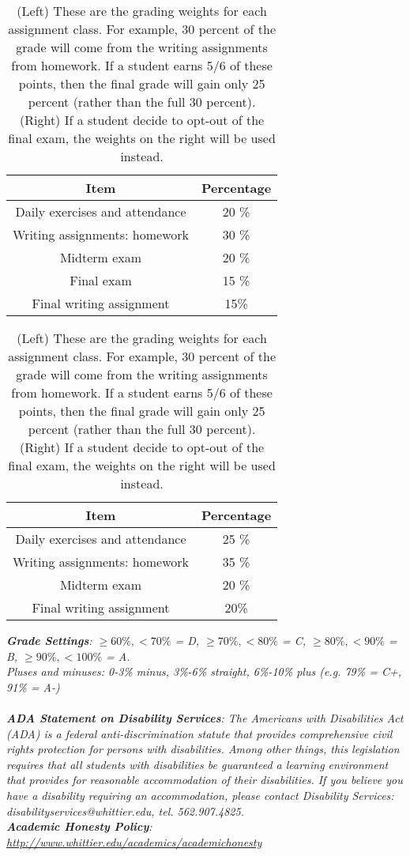 \documentclass[10pt]{article}
\begin{document}
\begin{table}[h]
\centering
\begin{tabular}{| c | c |}
\hline
Item & Percentage \\ \hline \hline
Daily exercises and attendance & 20 \% \\ \hline
Writing assignments: homework & 30 \% \\ \hline
Midterm exam & 20 \% \\ \hline
Final exam & 15 \% \\ \hline
Final writing assignment & 15\% \\ \hline
\end{tabular}
\begin{tabular}{| c | c |}
\hline
Item & Percentage \\ \hline \hline
Daily exercises and attendance & 25 \% \\ \hline
Writing assignments: homework & 35 \% \\ \hline
Midterm exam & 20 \% \\ \hline
Final writing assignment & 20\% \\ \hline
\end{tabular}
\caption{\label{tab:grades} (Left) These are the grading weights for each assignment class.  For example, 30 percent of the grade will come from the writing assignments from homework.  If a student earns 5/6 of these points, then the final grade will gain only 25 percent (rather than the full 30 percent). (Right) If a student decide to opt-out of the final exam, the weights on the right will be used instead.}
\end{table}
\textit{\textbf{Grade Settings}: $\geq 60\%, <70\%$ = D, $\geq 70\%, <80\%$ = C, $\geq 80\%, <90\%$ = B, $\geq 90\%, <100\%$ = A.  \\ Pluses and minuses: 0-3\% minus, 3\%-6\% straight, 6\%-10\% plus (e.g. 79\% = C+, 91\% = A-)} \\ \\
\textit{\textbf{ADA Statement on Disability Services}: The Americans with Disabilities Act (ADA) is a federal anti-discrimination statute that provides comprehensive civil rights protection for persons with disabilities. Among other things, this legislation requires that all students with disabilities be guaranteed a learning environment that provides for reasonable accommodation of their disabilities. If you believe you have a disability requiring an accommodation, please contact Disability Services: disabilityservices@whittier.edu, tel. 562.907.4825.} \\
\textit{\textbf{Academic Honesty Policy}: \url{http://www.whittier.edu/academics/academichonesty}} \\
\end{document}
